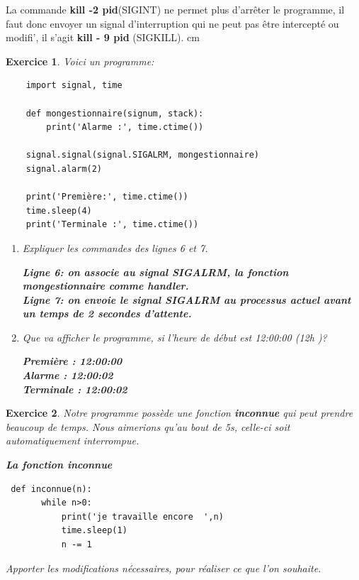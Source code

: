 \documentclass[10pt,french,A4]{article}
\theoremstyle{plain}
\newtheorem{exercice}{Exercice}
\newenvironment{code}[1]{%
    \begin{bclogo}[couleur=backcolour, couleurTexte=black ,couleurBord=blue ,couleurBarre=black, ombre=false,epBord=0.9,logo=\#,arrondi=0.1]{{\bfseries #1}}%
    }%
    {%
    \end{bclogo}
}%
\begin{document}
La commande \textbf{kill -2 pid}(SIGINT)  ne permet plus d'arrêter le programme, il faut donc envoyer un signal d'interruption qui ne peut pas être intercepté ou modifi', il s'agit \textbf{kill - 9 pid} (SIGKILL).
\fi
{} cm

\begin{exercice}
    Voici un programme:
        \begin{verbatim}
    import signal, time
    
    def mongestionnaire(signum, stack):
        print('Alarme :', time.ctime())
       
    signal.signal(signal.SIGALRM, mongestionnaire)
    signal.alarm(2)
    
    print('Première:', time.ctime())
    time.sleep(4)
    print('Terminale :', time.ctime())
   \end{verbatim}
   
   \begin{enumerate}
       \item Expliquer les commandes des lignes 6 et 7.
       
       \ifProf
    \textbf{Ligne 6: on associe au signal SIGALRM, la fonction mongestionnaire comme handler.}\\
    \textbf{Ligne 7: on envoie le signal SIGALRM au processus actuel avant un temps de 2 secondes d'attente.}
       \fi
       \item Que va afficher le programme, si l'heure de début est 12:00:00 (12h )?
              \ifProf
              
       \textbf{Première : 12:00:00}\\
       \textbf{Alarme : 12:00:02}\\
        \textbf{Terminale : 12:00:02}\\
       \fi
   \end{enumerate}
\end{exercice}

\begin{exercice}
   Notre programme possède une fonction \textbf{inconnue} qui peut prendre beaucoup de temps. Nous aimerions qu'au bout de 5s, celle-ci soit automatiquement interrompue.
   \begin{code}{La fonction inconnue}
        \begin{verbatim}
 def inconnue(n):
       while n>0:
           print('je travaille encore  ',n)
           time.sleep(1)
           n -= 1
       \end{verbatim}
   \end{code}
Apporter les modifications nécessaires, pour réaliser ce que l'on souhaite.
\end{exercice}
\end{document}
